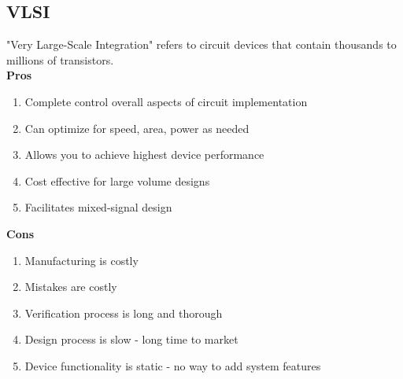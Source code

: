 \documentclass[11pt]{article}
\begin{document}
    \subsection{VLSI}
    "Very Large-Scale Integration" refers to circuit devices that contain thousands to millions of transistors. \\ 
    \textbf{Pros}
    \begin{enumerate}
        \item Complete control overall aspects of circuit implementation
        \item Can optimize for speed, area, power as needed
        \item Allows you to achieve highest device performance
        \item Cost effective for large volume designs
        \item Facilitates mixed-signal design
    \end{enumerate}
    \textbf{Cons}
    \begin{enumerate}
        \item Manufacturing is costly
        \item Mistakes are costly
        \item Verification process is long and thorough
        \item Design process is slow - long time to market
        \item Device functionality is static - no way to add system features
    \end{enumerate}
\end{document}
